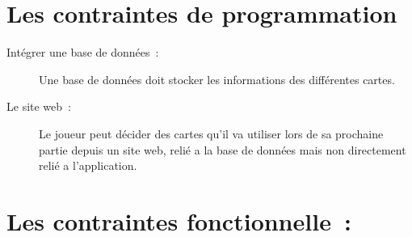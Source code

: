 \documentclass[a4paper, titlepage]{livret}
\begin{document}
  \section{Les contraintes de programmation}
    \begin{description}
      \item[Intégrer une base de données :] Une base de données doit stocker les informations des différentes cartes.
      \item[Le site web :] Le joueur peut décider des cartes qu’il va utiliser lors de sa prochaine partie depuis un site web, relié a la base de données mais non directement relié a l’application.
    \end{description}
    
      \section{Les contraintes fonctionnelle :}
\end{document}
